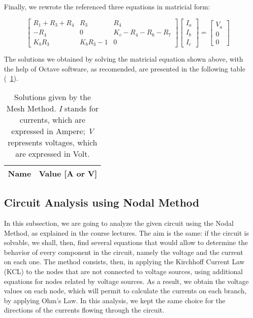 \medskip
Finally, we  rewrote the referenced three equations in matricial form:
\medskip

\begin{equation}
	\begin{bmatrix}
		R_1 + R_3 + R_4 & R_3 & R_4 \\
		-R_4 & 0 & K_c - R_4 - R_6 - R_7 \\
		K_bR_3 & K_bR_3 - 1 & 0
	\end{bmatrix}
	\begin{bmatrix}
		I_a \\
		I_b \\
		I_c
	\end{bmatrix}
	=
	\begin{bmatrix}
		V_a \\
		0 \\
		0
	\end{bmatrix}
\end{equation}

\vspace{1cm}

The solutions we obtained by solving the matricial equation shown above, with the help of Octave software, as recomended, are presented in the following table (~\ref{tab:mesh}).

\begin{table}[h]
	\centering
	\begin{tabular}{|l|r|}
		\hline    
		{\bf Name} & {\bf Value [A or V]} \\ \hline
		
	\end{tabular}
	\caption{Solutions given by the Mesh Method. {\em I} stands for currents, which
		are expressed in Ampere; {\it V} represents voltages, which are expressed in
		Volt.}
	\label{tab:mesh}
\end{table}




\subsection{Circuit Analysis using Nodal Method}
\label{sec:nodal}
In this subsection, we are going to analyze the given circuit using the Nodal Method, as explained in the course lectures. The aim is the same: if the circuit is solvable, we shall, then, find several equations that would allow to determine the behavior of every component in the circuit, namely the voltage and the current on each one.
The method consists, then, in applying the Kirchhoff Current Law (KCL) to the nodes that are not connected to voltage sources, using additional equations for nodes related by voltage sources. 
As a result, we obtain the voltage values on each node, which will permit to calculate the currents on each branch, by applying Ohm's Law. In this analysis, we kept the same choice for the directions of the currents flowing through the circuit.  
\vspace{0.5cm}

